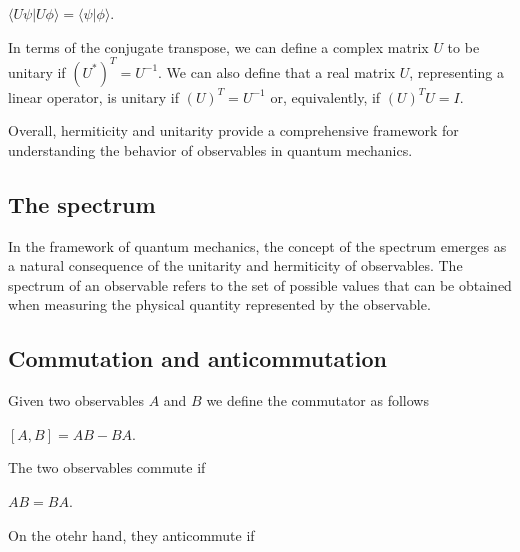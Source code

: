\documentclass{Configuration_Files/PoliMi3i_thesis}
\begin{document}
\begin{center}
	$\langle U\psi|U\phi \rangle = \langle \psi|\phi \rangle$.
\end{center}

In terms of the conjugate transpose, we can define a complex matrix $U$ to be unitary if $ (U^*)^T=U^{-1}$. We can also define that a real matrix $U$, representing a linear operator, is unitary if $(U)^T = U^{-1}$ or, equivalently, if $(U)^T U=I$. 

Overall, hermiticity and unitarity provide a comprehensive framework for understanding the behavior of observables in quantum mechanics.


\subsection{The spectrum}

In the framework of quantum mechanics, the concept of the spectrum emerges as a natural consequence of the unitarity and hermiticity of observables. The spectrum of an observable refers to the set of possible values that can be obtained when measuring the physical quantity represented by the observable. 




\subsection{Commutation and anticommutation}

Given two observables $A$ and $B$ we define the commutator as follows

\begin{center}
	$[A, B] = AB - BA$.
\end{center}

The two observables commute if 

\begin{center}
	$AB = BA$.
\end{center}

On the otehr hand, they anticommute if 
\end{document}
